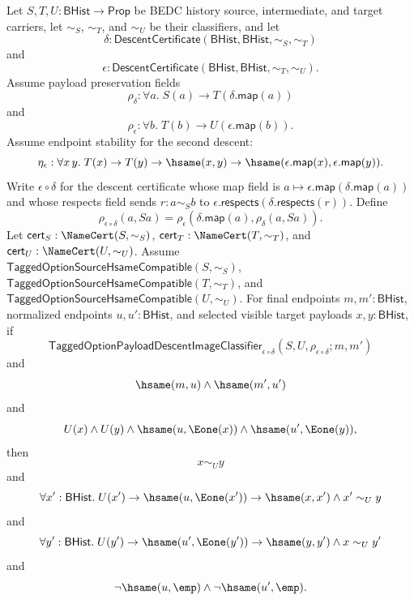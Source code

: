 \begin{theorem}
Let $S,T,U:\mathsf{BHist}\to\mathsf{Prop}$ be BEDC history source,
intermediate, and target carriers, let $\sim_S$, $\sim_T$, and $\sim_U$ be their
classifiers, and let
$$
\delta:\mathsf{DescentCertificate}(\mathsf{BHist},\mathsf{BHist},\sim_S,\sim_T)
$$
and
$$
\epsilon:\mathsf{DescentCertificate}(\mathsf{BHist},\mathsf{BHist},\sim_T,\sim_U).
$$
Assume payload preservation fields
$$
\rho_{\delta}:\forall a.\;S(a)\to T(\delta.\mathsf{map}(a))
$$
and
$$
\rho_{\epsilon}:\forall b.\;T(b)\to U(\epsilon.\mathsf{map}(b)).
$$
Assume endpoint stability for the second descent:
$$
\eta_{\epsilon}:\forall x\,y.\;
T(x)\to T(y)\to \hsame(x,y)\to
\hsame(\epsilon.\mathsf{map}(x),\epsilon.\mathsf{map}(y)).
$$
Write $\epsilon\circ\delta$ for the descent certificate whose map field is
$a\mapsto\epsilon.\mathsf{map}(\delta.\mathsf{map}(a))$ and whose respects field
sends $r:a\sim_S b$ to
$\epsilon.\mathsf{respects}(\delta.\mathsf{respects}(r))$. Define
$$
\rho_{\epsilon\circ\delta}(a,Sa)=
\rho_{\epsilon}(\delta.\mathsf{map}(a),\rho_{\delta}(a,Sa)).
$$
Let $\mathsf{cert}_S:\NameCert(S,\sim_S)$,
$\mathsf{cert}_T:\NameCert(T,\sim_T)$, and
$\mathsf{cert}_U:\NameCert(U,\sim_U)$. Assume
$\mathsf{TaggedOptionSourceHsameCompatible}(S,\sim_S)$,
$\mathsf{TaggedOptionSourceHsameCompatible}(T,\sim_T)$, and
$\mathsf{TaggedOptionSourceHsameCompatible}(U,\sim_U)$. For final endpoints
$m,m':\mathsf{BHist}$, normalized endpoints $u,u':\mathsf{BHist}$, and selected
visible target payloads $x,y:\mathsf{BHist}$, if
$$
\mathsf{TaggedOptionPayloadDescentImageClassifier}_{\epsilon\circ\delta}
(S,U,\rho_{\epsilon\circ\delta};m,m')
$$
and
$$
\hsame(m,u)\land \hsame(m',u')
$$
and
$$
U(x)\land U(y)\land
\hsame(u,\Eone(x))\land \hsame(u',\Eone(y)),
$$
then
$$
x\sim_U y
$$
and
$$
\forall x':\mathsf{BHist}.\;
U(x')\to
\hsame(u,\Eone(x'))\to
\hsame(x,x')\land x'\sim_U y
$$
and
$$
\forall y':\mathsf{BHist}.\;
U(y')\to
\hsame(u',\Eone(y'))\to
\hsame(y,y')\land x\sim_U y'
$$
and
$$
\neg\hsame(u,\emp)\land \neg\hsame(u',\emp).
$$
\end{theorem}
